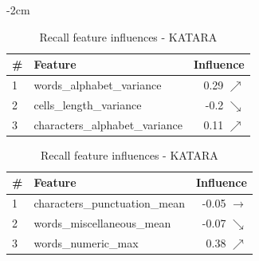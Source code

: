 \begin{table}[H]
	\centering
	\addtolength{\leftskip} {-2cm}
	\addtolength{\rightskip}{-2cm}
	\captionsetup[subtable]{position = below}
	\captionsetup[table]{position=top}
	\caption{Top feature influences - KATARA}
	\label{tab:feature_influences_KATARA}
		\begin{subtable}{0.5\linewidth}
		\centering
\begin{tabular}{llr}
\toprule
 \# &                         Feature &        Influence \\
\midrule
 1 &       words\_alphabet\_variance &  0.29 $\nearrow$ \\
 2 &         cells\_length\_variance &  -0.2 $\searrow$ \\
 3 &  characters\_alphabet\_variance &  0.11 $\nearrow$ \\
\bottomrule
\end{tabular}

		\caption{Precision feature influences - KATARA}
		\label{tab:prec_feature_influences_KATARA}
	\end{subtable}
	\hspace*{4em}
	\begin{subtable}{0.5\linewidth}
		\centering
\begin{tabular}{llr}
\toprule
 \# &                        Feature &            Influence \\
\midrule
 1 &  characters\_punctuation\_mean &  -0.05 $\rightarrow$ \\
 2 &     words\_miscellaneous\_mean &     -0.07 $\searrow$ \\
 3 &            words\_numeric\_max &      0.38 $\nearrow$ \\
\bottomrule
\end{tabular}
		\caption{Recall feature influences - KATARA}
		\label{tab:rec_feature_influences_KATARA}
	\end{subtable}%
\end{table}



